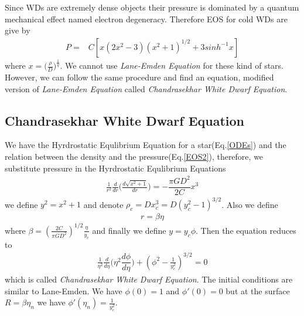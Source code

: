 \documentclass[aps,twocolumn,showpacs,preprintnumbers,nofootinbib,prl,superscriptaddress,groupedaddress]{revtex4-1}
\begin{document}
Since WDs are extremely dense objects their pressure is dominated by a quantum mechanical effect named electron degeneracy. Therefore EOS for cold WDs are give by
\begin{align}\label{EOS2}
	P =& C [ x(2x^2-3)(x^2+1)^{1/2} + 3sinh^{-1}x]
\end{align}
where $ x = \big(\frac{\rho}{D}\big)^{\frac{1}{q}} $. We cannot use \textit{Lane-Emden Equation} for these kind of stars. However, we can follow the same procedure and find an equation, modified version of \textit{Lane-Emden Equation} called \textit{Chandrasekhar White Dwarf Equation}.

\subsection{Chandrasekhar White Dwarf Equation}
We have the Hyrdrostatic Equlibrium Equation for a star(Eq.\ref{ODEs}) and the relation between the density and the pressure(Eq.\ref{EOS2}), therefore, we substitute pressure in the Hyrdrostatic Equlibrium Equations
\begin{align}
	\frac{1}{r^2}\frac{d}{dr}\bigg(\frac{d\sqrt{x^2 + 1}}{dr}\bigg) = - \dfrac{\pi G D^2}{2C}x^3 \nonumber
\end{align}
we define $y^2 = x^2 + 1$ and denote $ \rho_c = Dx_c^3 = D (y_c^2 - 1)^{3/2}$. Also we define
\begin{align}
	r = \beta \eta
\end{align}
where $ \beta = (\frac{2C}{\pi G D^2})^{1/2} \frac{\eta}{y_c} $ and finally we define $y = y_c \phi $. Then the equation reduces to
\begin{align}\label{Chandrasekhar WD}
	\frac{1}{\eta^2}\frac{d}{d\eta}\bigg(\eta^2 \dfrac{d\phi}{d\eta}\bigg) + (\phi^2 - \frac{1}{y_c^2})^{3/2} =0
\end{align}
which is called \textit{Chandrasekhar White Dwarf Equation}. The initial conditions are similar to Lane-Emden. We have $\phi(0) = 1$ and $\phi'(0) = 0$ but at the surface $ R=\beta\eta_n $ we have $\phi'(\eta_n) = \frac{1}{y_c^2}$.
\end{document}
